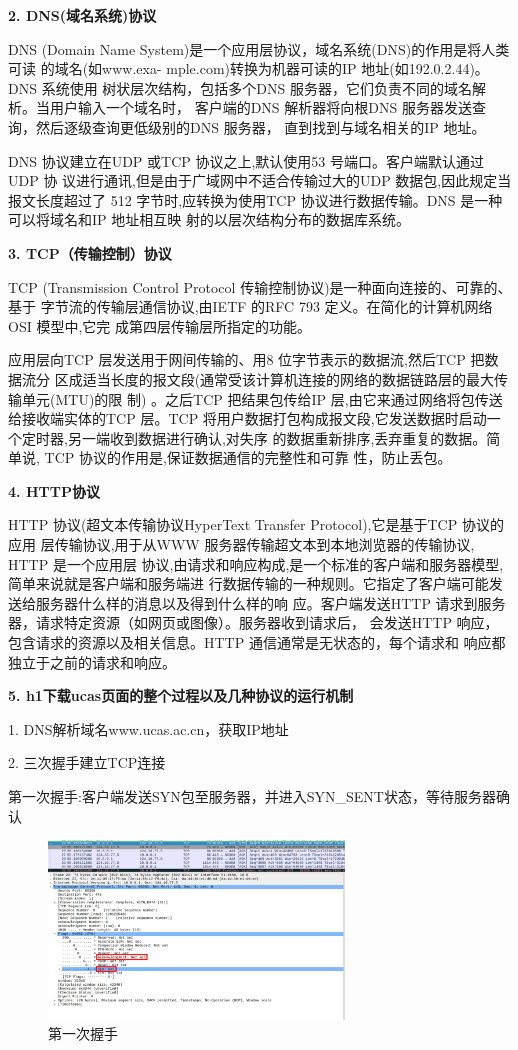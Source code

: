 \documentclass[11pt]{article}
\begin{document}
\textbf{2. DNS(域名系统)协议}

DNS (Domain Name System)是一个应用层协议，域名系统(DNS)的作用是将人类可读
的域名(如www.exa-
mple.com)转换为机器可读的IP 地址(如192.0.2.44)。 DNS 系统使用
树状层次结构，包括多个DNS 服务器，它们负责不同的域名解析。当用户输入一个域名时，
客户端的DNS 解析器将向根DNS 服务器发送查询，然后逐级查询更低级别的DNS 服务器，
直到找到与域名相关的IP 地址。

DNS 协议建立在UDP 或TCP 协议之上,默认使用53 号端口。客户端默认通过UDP 协
议进行通讯,但是由于广域网中不适合传输过大的UDP 数据包,因此规定当报文长度超过了
512 字节时,应转换为使用TCP 协议进行数据传输。DNS 是一种可以将域名和IP 地址相互映
射的以层次结构分布的数据库系统。

\textbf{3. TCP（传输控制）协议}

TCP (Transmission Control Protocol 传输控制协议)是一种面向连接的、可靠的、基于
字节流的传输层通信协议,由IETF 的RFC 793 定义。在简化的计算机网络OSI 模型中,它完
成第四层传输层所指定的功能。

应用层向TCP 层发送用于网间传输的、用8 位字节表示的数据流,然后TCP 把数据流分
区成适当长度的报文段(通常受该计算机连接的网络的数据链路层的最大传输单元(MTU)的限
制) 。之后TCP 把结果包传给IP 层,由它来通过网络将包传送给接收端实体的TCP 层。TCP
将用户数据打包构成报文段,它发送数据时启动一个定时器,另一端收到数据进行确认,对失序
的数据重新排序,丢弃重复的数据。简单说, TCP 协议的作用是,保证数据通信的完整性和可靠
性，防止丢包。

\textbf{4. HTTP协议}

HTTP 协议(超文本传输协议HyperText Transfer Protocol),它是基于TCP 协议的应用
层传输协议,用于从WWW 服务器传输超文本到本地浏览器的传输协议, HTTP 是一个应用层
协议,由请求和响应构成,是一个标准的客户端和服务器模型,简单来说就是客户端和服务端进
行数据传输的一种规则。它指定了客户端可能发送给服务器什么样的消息以及得到什么样的响
应。客户端发送HTTP 请求到服务器，请求特定资源（如网页或图像）。服务器收到请求后，
会发送HTTP 响应，包含请求的资源以及相关信息。HTTP 通信通常是无状态的，每个请求和
响应都独立于之前的请求和响应。


\textbf{5. h1下载ucas页面的整个过程以及几种协议的运行机制}

1. DNS解析域名www.ucas.ac.cn，获取IP地址

2. 三次握手建立TCP连接

  第一次握手:客户端发送SYN包至服务器，并进入SYN_SENT状态，等待服务器确认


  \begin{figure}[htbp]
    \centering
    \includegraphics[width=0.7\textwidth]{fig/hand1.png}
    \caption{第一次握手}
    \label{fig:1}
  \end{figure}
\end{document}
